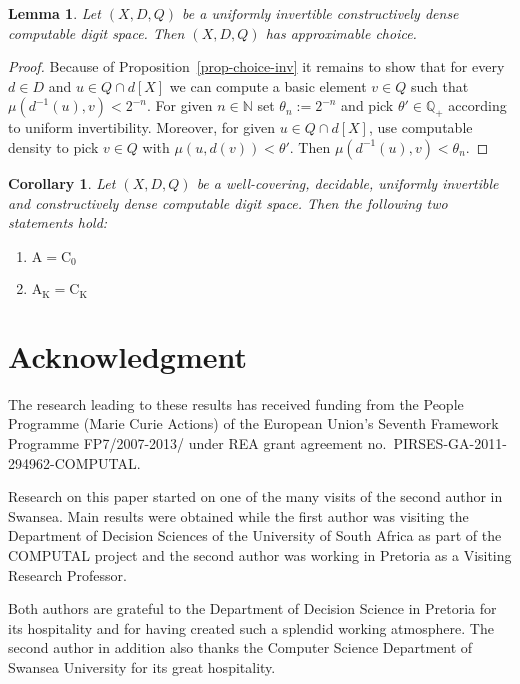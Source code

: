 \documentclass[microtype]{jloganal}
\theoremstyle{plain}
\newtheorem{lemma}[theorem]{Lemma}
\newtheorem{corollary}[theorem]{Corollary}
\theoremstyle{definition}
\newcommand{\NN}{\mathbb{N}}
\newcommand{\QQ}{\mathbb{Q}}
\newcommand{\coco}{\mathrm{C}}
\newcommand{\compact}{\mathrm{K}}
\newcommand{\cauchy}{\mathrm{A}}
\begin{document}
\begin{lemma}
\label{lem-unifinv-uniffib}
Let $(X, D,Q)$ be a uniformly invertible constructively dense computable digit space. Then $(X,D,Q)$ has approximable choice. 
\end{lemma}
\begin{proof}
Because of Proposition~\ref{prop-choice-inv} it remains to show that for every $d \in D$ and $u \in Q \cap d[X]$ we can compute a basic element $v \in Q$ such that $\mu(d^{-1}(u), v) < 2^{-n}$. For given $n \in \NN$ set $\theta_n := 2^{-n}$ and pick $\theta' \in \QQ_+$ according to uniform invertibility. Moreover, for given $u \in Q\cap d[X]$, use computable density to pick $v \in Q$ with $\mu(u, d(v)) < \theta'$. Then $\mu(d^{-1}(u), v) < \theta_n$.
 \end{proof}

\begin{corollary}
\label{cor-cauchy-coind}
Let $(X, D,Q)$  be a well-covering, decidable, uniformly invertible and constructively dense computable digit space. Then the following two statements hold:
\begin{enumerate}
\item\label{cor-cauchy-coind-1} $\cauchy = \coco_0$

\item\label{cor-cauchy-coind-2} $\cauchy_{\compact} = \coco_{\compact}$

\end{enumerate}
\end{corollary}



\section*{Acknowledgment}

The research leading to these results has received funding from the People Programme (Marie Curie Actions) of the European Union's Seventh Framework Programme FP7/2007-2013/ under REA grant agreement no.\ PIRSES-GA-2011-294962-COMPUTAL.

Research on this paper started on one of the many visits of the second author in Swansea. Main results were obtained while the first author was visiting the Department of Decision Sciences of the University of South Africa as part of the COMPUTAL project  and the second author was working in Pretoria as a Visiting Research Professor. 

Both authors are grateful to the Department of Decision Science in Pretoria for its hospitality and for having created such a splendid working atmosphere. The second author in addition also thanks the Computer Science Department of Swansea University for its great hospitality.
\end{document}
